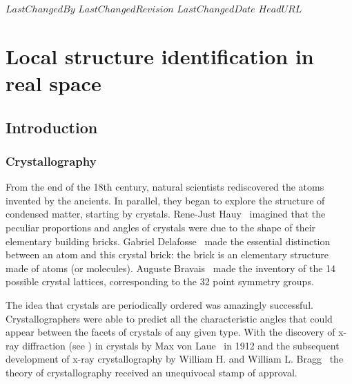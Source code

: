 \svnidlong
{$LastChangedBy$}
{$LastChangedRevision$}
{$LastChangedDate$}
{$HeadURL$}

\chapter{Local structure identification in real space}
\label{ch:structure_id}
\section{Introduction}
\subsection{Crystallography}

From the end of the 18th century, natural scientists rediscovered the atoms invented by the ancients. In parallel, they began to explore the structure of condensed matter, starting by crystals. Rene-Just Hauy~\citep{Hauy1784} imagined that the peculiar proportions and angles of crystals were due to the shape of their elementary building bricks. Gabriel Delafosse~\citep{Delafosse1840} made the essential distinction between an atom and this crystal brick: the brick is an elementary structure made of atoms (or molecules). Auguste Bravais~\citep{Bravais1866} made the inventory of the 14 possible crystal lattices, corresponding to the 32 point symmetry groups.

The idea that crystals are periodically ordered was amazingly successful. Crystallographers were able to predict all the characteristic angles that could appear between the facets of crystals of any given type. With the discovery of x-ray diffraction (see ) in crystals by Max von Laue~\citep{Laue1912} in 1912 and the subsequent development of x-ray crystallography by William H. and William L. Bragg~\citep{bragg1965crystalline} the theory of crystallography received an unequivocal stamp of approval.

